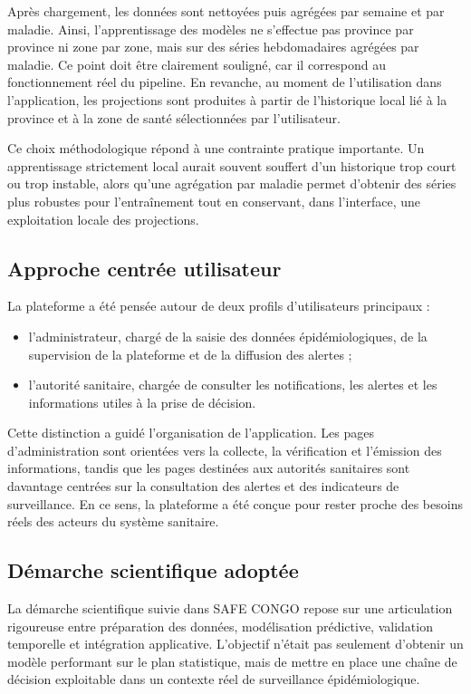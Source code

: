 Après chargement, les données sont nettoyées puis agrégées par semaine et par maladie. Ainsi, l'apprentissage des modèles ne s'effectue pas province par province ni zone par zone, mais sur des séries hebdomadaires agrégées par maladie. Ce point doit être clairement souligné, car il correspond au fonctionnement réel du pipeline. En revanche, au moment de l'utilisation dans l'application, les projections sont produites à partir de l'historique local lié à la province et à la zone de santé sélectionnées par l'utilisateur.

Ce choix méthodologique répond à une contrainte pratique importante. Un apprentissage strictement local aurait souvent souffert d'un historique trop court ou trop instable, alors qu'une agrégation par maladie permet d'obtenir des séries plus robustes pour l'entraînement tout en conservant, dans l'interface, une exploitation locale des projections.

\subsection{Approche centrée utilisateur}

La plateforme a été pensée autour de deux profils d'utilisateurs principaux :

\begin{itemize}
  \item l'administrateur, chargé de la saisie des données épidémiologiques, de la supervision de la plateforme et de la diffusion des alertes ;
  \item l'autorité sanitaire, chargée de consulter les notifications, les alertes et les informations utiles à la prise de décision.
\end{itemize}

Cette distinction a guidé l'organisation de l'application. Les pages d'administration sont orientées vers la collecte, la vérification et l'émission des informations, tandis que les pages destinées aux autorités sanitaires sont davantage centrées sur la consultation des alertes et des indicateurs de surveillance. En ce sens, la plateforme a été conçue pour rester proche des besoins réels des acteurs du système sanitaire.

\subsection{Démarche scientifique adoptée}

La démarche scientifique suivie dans SAFE CONGO repose sur une articulation rigoureuse entre préparation des données, modélisation prédictive, validation temporelle et intégration applicative. L'objectif n'était pas seulement d'obtenir un modèle performant sur le plan statistique, mais de mettre en place une chaîne de décision exploitable dans un contexte réel de surveillance épidémiologique.

